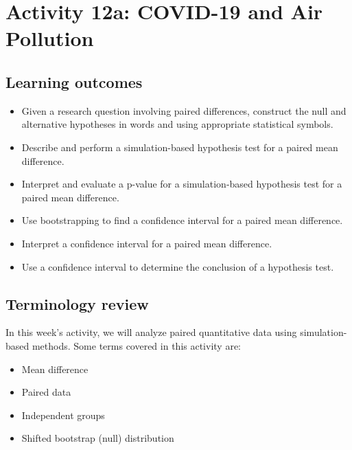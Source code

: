 \documentclass[
]{report}
\begin{document}
\newpage

\hypertarget{activity-12a-covid-19-and-air-pollution}{%
\section{Activity 12a: COVID-19 and Air Pollution}\label{activity-12a-covid-19-and-air-pollution}}


\hypertarget{learning-outcomes-7}{%
\subsection{Learning outcomes}\label{learning-outcomes-7}}

\begin{itemize}
\item
  Given a research question involving paired differences, construct the null and alternative hypotheses
  in words and using appropriate statistical symbols.
\item
  Describe and perform a simulation-based hypothesis test for a paired mean difference.
\item
  Interpret and evaluate a p-value for a simulation-based hypothesis test for a paired mean difference.
\item
  Use bootstrapping to find a confidence interval for a paired mean difference.
\item
  Interpret a confidence interval for a paired mean difference.
\item
  Use a confidence interval to determine the conclusion of a hypothesis test.
\end{itemize}

\hypertarget{terminology-review-19}{%
\subsection{Terminology review}\label{terminology-review-19}}

In this week's activity, we will analyze paired quantitative data using simulation-based methods. Some terms covered in this activity are:

\begin{itemize}
\item
  Mean difference
\item
  Paired data
\item
  Independent groups
\item
  Shifted bootstrap (null) distribution
\end{itemize}
\end{document}
